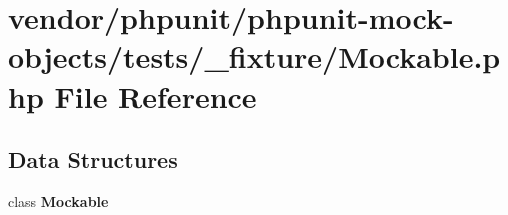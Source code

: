 \section{vendor/phpunit/phpunit-\/mock-\/objects/tests/\+\_\+fixture/\+Mockable.php File Reference}
\label{_mockable_8php}
\subsection*{Data Structures}
\begin{DoxyCompactItemize}
\item 
class {\bf Mockable}
\end{DoxyCompactItemize}
